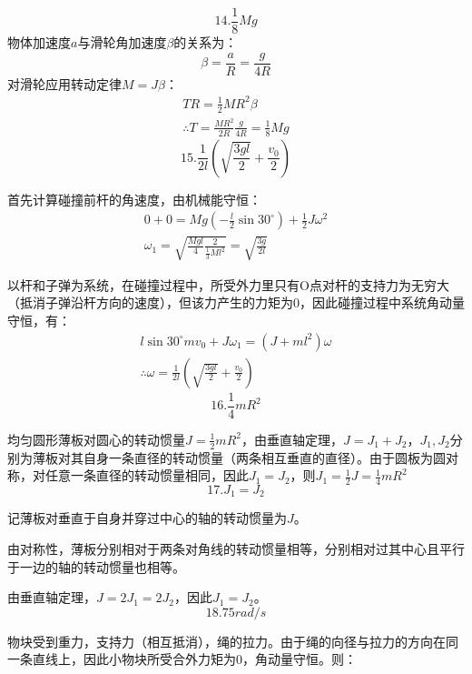 \documentclass[blue, pad]{./templete/qyxfnote}
\begin{document}
			\[14.\frac{1}{8}Mg\]
			物体加速度$ a $与滑轮角加速度$ \beta $的关系为：
			\[\beta=\frac{a}{R}=\frac{g}{4R}\]
			对滑轮应用转动定律$M=J\beta$：
			\begin{gather*}
			TR=\frac{1}{2}MR^2\beta\\
			\therefore T=\frac{MR^2}{2R}\frac{g}{4R}=\frac{1}{8}Mg
			\end{gather*}
			\[15.\frac{1}{2l}\left(\sqrt{\frac{3gl}{2}}+\frac{v_0}{2}\right)\]\par
			首先计算碰撞前杆的角速度，由机械能守恒：
			\begin{gather*}
			0+0=Mg(-\frac{l}{2}\sin 30^\circ)+\frac{1}{2}J\omega^2\\
			\omega_1=\sqrt{\frac{Mgl}{4}\frac{2}{\frac{1}{3}Ml^2}}=\sqrt{\frac{3g}{2l}}
			\end{gather*}\par
			以杆和子弹为系统，在碰撞过程中，所受外力里只有O点对杆的支持力为无穷大（抵消子弹沿杆方向的速度），但该力产生的力矩为0，因此碰撞过程中系统角动量守恒，有：
			\begin{gather*}
			l\sin 30^\circ mv_0+J\omega_1=(J+ml^2)\omega\\
			\therefore \omega=\frac{1}{2l}\left(\sqrt{\frac{3gl}{2}}+\frac{v_0}{2}\right)
			\end{gather*}
			\[16.\frac{1}{4}mR^2 \]\par		
			均匀圆形薄板对圆心的转动惯量$ J=\frac{1}{2}mR^2 $，由垂直轴定理，$ J=J_1+J_2 $，$ J_1,J_2 $分别为薄板对其自身一条直径的转动惯量（两条相互垂直的直径）。由于圆板为圆对称，对任意一条直径的转动惯量相同，因此$ J_1=J_2 $，则$ J_1=\frac{1}{2}J=\frac{1}{4}mR^2 $
			\[17.J_1=J_2\]\par
			记薄板对垂直于自身并穿过中心的轴的转动惯量为$ J $。\par
			由对称性，薄板分别相对于两条对角线的转动惯量相等，分别相对过其中心且平行于一边的轴的转动惯量也相等。\par
			\par
			由垂直轴定理，$ J=2J_1=2J_2 $，因此$ J_1=J_2 $。
			\[18.75rad/s\]\par
			物块受到重力，支持力（相互抵消），绳的拉力。由于绳的向径与拉力的方向在同一条直线上，因此小物块所受合外力矩为0，角动量守恒。则：
\end{document}
